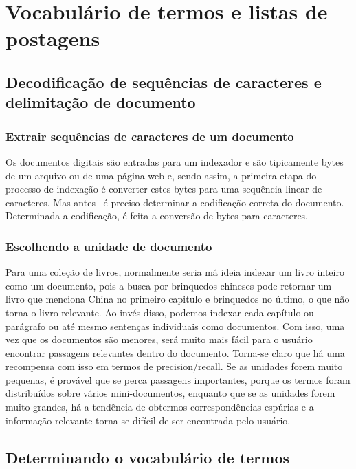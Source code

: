 \section{Vocabulário de termos e listas de postagens}
\label{sec:lista_postagens}

\subsection{Decodificação de sequências de caracteres e delimitação de documento}

\subsubsection{Extrair sequências de caracteres de um documento}

Os documentos digitais são entradas para um indexador e são tipicamente bytes de um arquivo ou de uma página web e, sendo assim, a primeira etapa do processo de indexação é converter estes bytes para uma sequência linear de caracteres. Mas antes  é preciso determinar a codificação correta do documento. Determinada a codificação, é feita a conversão de bytes para caracteres. 

\subsubsection{Escolhendo a unidade de documento}

Para uma coleção de livros, normalmente seria má ideia indexar um livro inteiro como um documento, pois a busca por brinquedos chineses pode retornar um livro que menciona China no primeiro capitulo e brinquedos no último, o que não torna o livro relevante. Ao invés disso, podemos indexar cada capítulo ou parágrafo ou até mesmo sentenças individuais como documentos. Com isso, uma vez que os documentos são menores, será muito mais fácil para o usuário encontrar passagens relevantes dentro do documento. Torna-se claro que há uma recompensa com isso em termos de precision/recall. Se as unidades forem muito pequenas, é provável que se perca passagens importantes, porque os termos foram distribuídos sobre vários mini-documentos, enquanto que se as unidades forem muito grandes, há a tendência de obtermos correspondências espúrias e a informação relevante torna-se difícil de ser encontrada pelo usuário.

\subsection{Determinando o vocabulário de termos}

